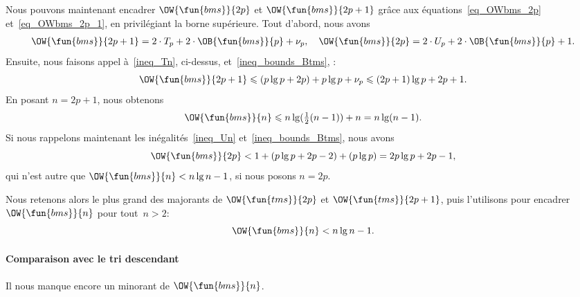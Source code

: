 Nous pouvons maintenant encadrer
\(\OW{\fun{bms}}{2p}\) et
\(\OW{\fun{bms}}{2p+1}\) grâce aux équations~\eqref{eq_OWbms_2p}
et~\eqref{eq_OWbms_2p_1}, en privilégiant la borne supérieure. Tout
d'abord, nous avons
\begin{align*}
\OW{\fun{bms}}{2p+1} = 2 \cdot T_p + 2 \cdot \OB{\fun{bms}}{p} +
\nu_p,
\quad
\OW{\fun{bms}}{2p} = 2 \cdot U_p + 2 \cdot \OB{\fun{bms}}{p} + 1.
\end{align*}
Ensuite, nous faisons appel à~\eqref{ineq_Tn}, ci-dessus,
et~\eqref{ineq_bounds_Btms}, :
\begin{equation*}
\OW{\fun{bms}}{2p+1}
  \leqslant (p\lg p + 2p) + p\lg p + \nu_p
   \leqslant (2p+1)\lg p + 2p + 1.
\end{equation*}
En posant \(n=2p+1\), nous obtenons
\begin{equation*}
\OW{\fun{bms}}{n}
  \leqslant n\lg(\tfrac{1}{2}(n-1)) + n = n\lg(n-1).
\end{equation*}
Si nous rappelons maintenant les inégalités~\eqref{ineq_Un}
et~\eqref{ineq_bounds_Btms}, nous avons
\begin{equation*}
\OW{\fun{bms}}{2p} < 1 + (p\lg p + 2p - 2) + (p\lg p)
             = 2p\lg p + 2p - 1,
\end{equation*}
qui n'est autre que \(\OW{\fun{bms}}{n} < n\lg n - 1\), si nous
posons \(n = 2p\).

Nous retenons alors le plus grand des majorants de
\(\OW{\fun{tms}}{2p}\) et \(\OW{\fun{tms}}{2p+1}\), puis l'utilisons
pour encadrer \(\OW{\fun{bms}}{n}\) pour tout~\(n > 2\):
\begin{equation}
\OW{\fun{bms}}{n} < n\lg n - 1.
\label{ineq_OWbms_up}
\end{equation}

\paragraph{Comparaison avec le tri descendant}

Il nous manque encore un minorant de \(\OW{\fun{bms}}{n}\).



